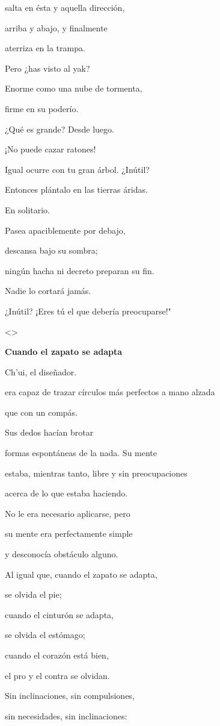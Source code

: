salta en ésta y aquella dirección,

arriba y abajo, y finalmente

aterriza en la trampa.

Pero ¿has visto al yak?

Enorme como una nube de tormenta,

firme en su poderío.

¿Qué es grande? Desde luego.

¡No puede cazar ratones!

Igual ocurre con tu gran árbol. ¿Inútil?

Entonces plántalo en las tierras áridas.

En solitario.

Pasea apaciblemente por debajo,

descansa bajo su sombra;

ningún hacha ni decreto preparan su fin.

Nadie lo cortará jamás.

¿Inútil? ¡Eres tú el que debería preocuparse!"

\textless\textgreater{}

\textbf{{Cuando el zapato se adapta}}

Ch'ui, el diseñador.

era capaz de trazar círculos más perfectos a mano alzada

que con un compás.

Sus dedos hacían brotar

formas espontáneas de la nada. Su mente

estaba, mientras tanto, libre y sin preocupaciones

acerca de lo que estaba haciendo.

No le era necesario aplicarse, pero

su mente era perfectamente simple

y desconocía obstáculo alguno.

Al igual que, cuando el zapato se adapta,

se olvida el pie;

cuando el cinturón se adapta,

se olvida el estómago;

cuando el corazón está bien,

el pro y el contra se olvidan.

Sin inclinaciones, sin compulsiones,

sin necesidades, sin inclinaciones:

